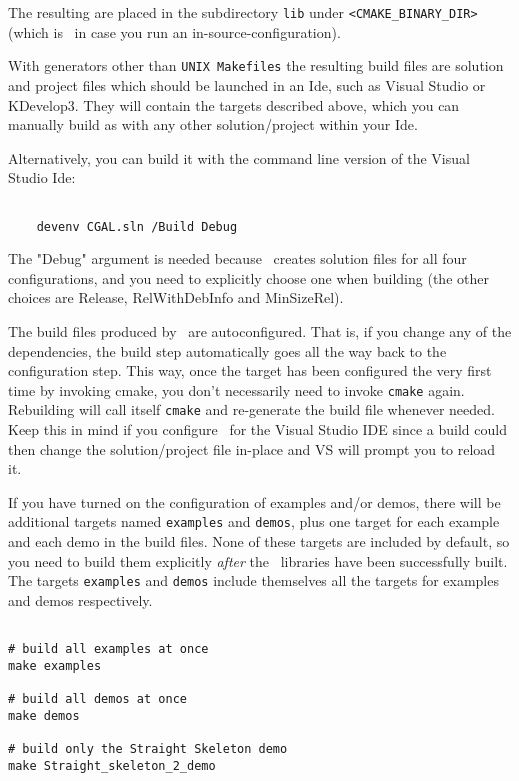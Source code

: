 The resulting are placed in the subdirectory {\tt lib} under {\tt <CMAKE\_BINARY\_DIR>}
(which is \cgaldir\ in case you run an in-source-configuration).

With generators other than {\tt UNIX Makefiles} the resulting build files
are solution and project files which
should be launched in an {\sc Ide}, such as Visual Studio or KDevelop3. They will contain the targets described
above, which you can manually build as with any other solution/project within your {\sc Ide}.

Alternatively, you can build it with the command line version of the
{\sc Visual Studio Ide}:

{\ccTexHtml{\scriptsize}{}
\begin{verbatim}

    devenv CGAL.sln /Build Debug

\end{verbatim}
}

The "Debug" argument is needed because \cmake\ creates solution files for
all four configurations, and you need to explicitly choose one when building
(the other choices are Release, RelWithDebInfo and MinSizeRel).


\begin{ccAdvanced}
The build files produced by \cmake\ are autoconfigured. That is, if you change any 
of the dependencies, the build step automatically goes all the way back to
the configuration step. This way, once the target has been configured the
very first time by
invoking cmake, you don't necessarily need to invoke \texttt{cmake} again. Rebuilding will call
itself \texttt{cmake} and re-generate the build file whenever needed. Keep this in mind if you
configure \cgal\ for the Visual Studio IDE since a build could then change the solution/project 
file in-place and VS will prompt you to reload it.
\end{ccAdvanced}


If you have turned on the configuration of examples and/or demos, there will be additional
targets named \texttt{examples} and \texttt{demos}, plus one target for
each example and each demo in the build files.
None of these targets are included by default, so you need to build them explicitly
{\em after} the \cgal\ libraries have been successfully built.
The targets \texttt{examples} and \texttt{demos} include themselves all the targets
for examples and demos respectively.

{\ccTexHtml{\scriptsize}{}
\begin{verbatim}

# build all examples at once
make examples 

# build all demos at once
make demos

# build only the Straight Skeleton demo
make Straight_skeleton_2_demo

\end{verbatim}
}

